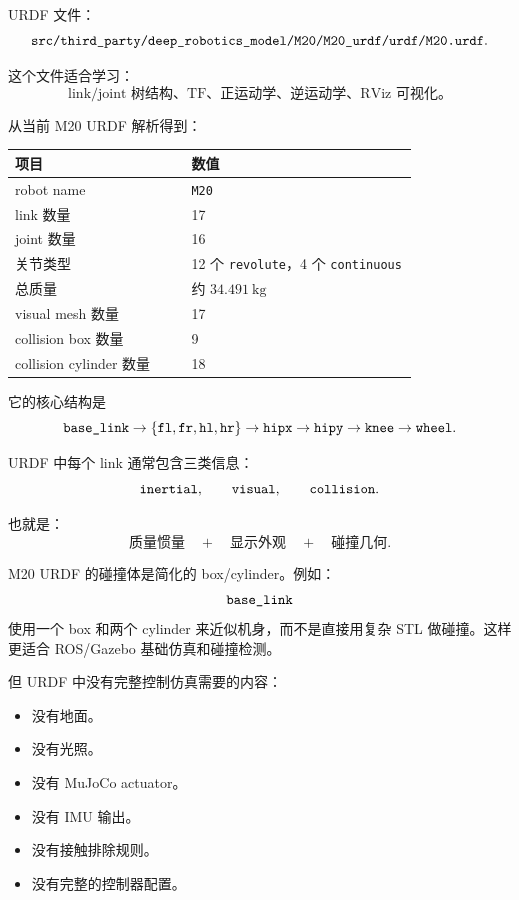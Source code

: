 \documentclass[UTF8,11pt,a4paper]{ctexart}
\begin{document}
URDF 文件：
\[
\text{\texttt{src/third\_party/deep\_robotics\_model/M20/M20\_urdf/urdf/M20.urdf}}.
\]

这个文件适合学习：
\[
\text{link/joint 树结构、TF、正运动学、逆运动学、RViz 可视化。}
\]

从当前 M20 URDF 解析得到：

\begin{center}
\begin{tabular}{p{0.35\linewidth}p{0.45\linewidth}}
\toprule
项目 & 数值 \\
\midrule
robot name & \texttt{M20}\\
link 数量 & 17\\
joint 数量 & 16\\
关节类型 & 12 个 \texttt{revolute}，4 个 \texttt{continuous}\\
总质量 & 约 \(34.491\ \mathrm{kg}\)\\
visual mesh 数量 & 17\\
collision box 数量 & 9\\
collision cylinder 数量 & 18\\
\bottomrule
\end{tabular}
\end{center}

它的核心结构是
\[
\text{\texttt{base\_link}}
\rightarrow
\{\text{\texttt{fl}},\text{\texttt{fr}},\text{\texttt{hl}},\text{\texttt{hr}}\}
\rightarrow
\text{\texttt{hipx}}
\rightarrow
\text{\texttt{hipy}}
\rightarrow
\text{\texttt{knee}}
\rightarrow
\text{\texttt{wheel}}.
\]

URDF 中每个 link 通常包含三类信息：
\[
\text{\texttt{inertial}},\qquad
\text{\texttt{visual}},\qquad
\text{\texttt{collision}}.
\]

也就是：
\[
\text{质量惯量}
\quad+\quad
\text{显示外观}
\quad+\quad
\text{碰撞几何}.
\]

M20 URDF 的碰撞体是简化的 box/cylinder。例如：
\[
\text{\texttt{base\_link}}
\]
使用一个 box 和两个 cylinder 来近似机身，而不是直接用复杂 STL 做碰撞。这样更适合 ROS/Gazebo 基础仿真和碰撞检测。

但 URDF 中没有完整控制仿真需要的内容：

\begin{itemize}
  \item 没有地面。
  \item 没有光照。
  \item 没有 MuJoCo actuator。
  \item 没有 IMU 输出。
  \item 没有接触排除规则。
  \item 没有完整的控制器配置。
\end{itemize}
\end{document}
